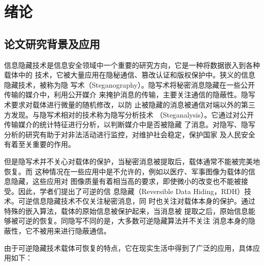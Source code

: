 ﻿\chapter{绪论}
\label{chap:introduction}

\section{论文研究背景及应用}
\label{s:background}
信息隐藏技术是信息安全领域中一个重要的研究方向，它是一种将数据嵌入到各种载体中的
技术，它被大量应用在隐秘通信、篡改认证和版权保护中。狭义的信息隐藏技术，被称为隐
写术（Steganography）。隐写术将秘密消息隐藏在一些公开传输的媒介中，利用公开媒介
来掩护消息的传输，主要关注通信的隐蔽性。隐写术要求对载体进行微量的随机修改，以防
止被隐藏的消息被通信对端以外的第三方发现。与隐写术相对的技术称为隐写分析技术
（Steganalysis）。它通过对公开传输媒介的统计特征进行分析，以判断媒介中是否被隐藏
了消息。对隐写、隐写分析的研究有助于对非法活动进行监控，对维护社会稳定，保护国家
及人民安全有着至关重要的作用。
\par
但是隐写术并不关心对载体的保护，当秘密消息被提取后，载体通常不能被完美地恢复。而
这种情况在一些应用中是不允许的，例如以医疗、军事图像为载体的信息隐藏，这些应用对
图像质量有着相当高的要求，即使微小的改变也不能被接受。因此，学者们提出了可逆的信
息隐藏（Reversible Data Hiding，RDH）技术。可逆信息隐藏技术不仅关注秘密消息，同
时也关注对载体本身的保护。通过特殊的嵌入算法，载体的原始信息被保护起来，当消息被
提取之后，原始信息能够被可逆的恢复。同隐写不同的是，大多数可逆隐藏算法并不关注
消息本身的隐蔽性，它不被用来进行隐蔽通信。
\par
由于可逆隐藏技术载体可恢复的特点，它在现实生活中得到了广泛的应用，具体应用如下：
\par
